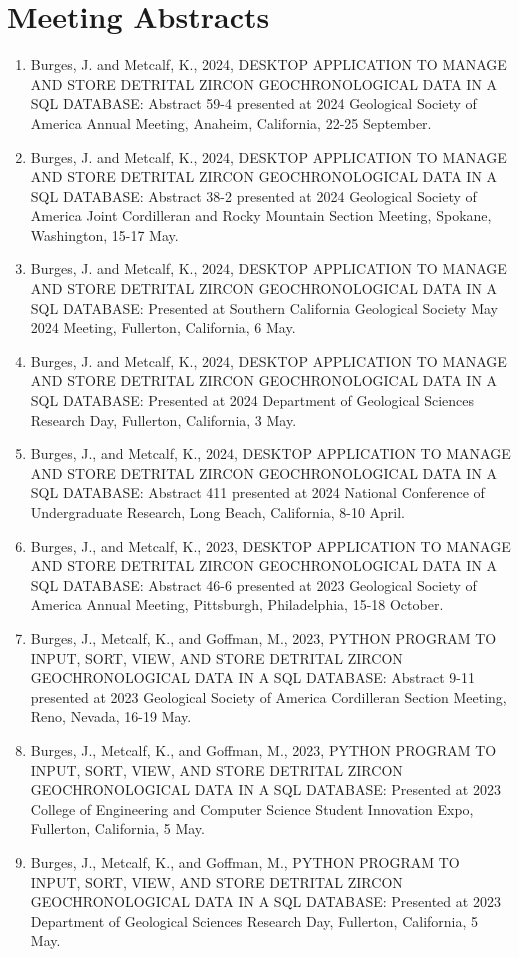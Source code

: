 \documentclass[11pt,a4paper,sans]{moderncv}
\begin{document}
\section{Meeting Abstracts}
\begin{enumerate}[9.]
\item Burges, J. and Metcalf, K., 2024, DESKTOP APPLICATION TO MANAGE AND STORE DETRITAL ZIRCON GEOCHRONOLOGICAL DATA IN A SQL DATABASE: Abstract 59-4 presented at 2024 Geological Society of America Annual Meeting, Anaheim, California, 22-25 September.
\item Burges, J. and Metcalf, K., 2024, DESKTOP APPLICATION TO MANAGE AND STORE DETRITAL ZIRCON GEOCHRONOLOGICAL DATA IN A SQL DATABASE: Abstract 38-2 presented at 2024 Geological Society of America Joint Cordilleran and Rocky Mountain Section Meeting, Spokane, Washington, 15-17 May.
\item Burges, J. and Metcalf, K., 2024, DESKTOP APPLICATION TO MANAGE AND STORE DETRITAL ZIRCON GEOCHRONOLOGICAL DATA IN A SQL DATABASE: Presented at Southern California Geological Society May 2024 Meeting, Fullerton, California, 6 May.
\item Burges, J. and Metcalf, K., 2024, DESKTOP APPLICATION TO MANAGE AND STORE DETRITAL ZIRCON GEOCHRONOLOGICAL DATA IN A SQL DATABASE: Presented at 2024 Department of Geological Sciences Research Day, Fullerton, California, 3 May.
\item Burges, J., and Metcalf, K., 2024, DESKTOP APPLICATION TO MANAGE AND STORE DETRITAL ZIRCON GEOCHRONOLOGICAL DATA IN A SQL DATABASE: Abstract 411 presented at 2024 National Conference of Undergraduate Research, Long Beach, California, 8-10 April.
\item Burges, J., and Metcalf, K., 2023, DESKTOP APPLICATION TO MANAGE AND STORE DETRITAL ZIRCON GEOCHRONOLOGICAL DATA IN A SQL DATABASE: Abstract 46-6 presented at 2023 Geological Society of America Annual Meeting, Pittsburgh, Philadelphia, 15-18 October.
\item Burges, J., Metcalf, K., and Goffman, M., 2023, PYTHON PROGRAM TO INPUT, SORT, VIEW, AND STORE DETRITAL ZIRCON GEOCHRONOLOGICAL DATA IN A SQL DATABASE: Abstract 9-11 presented at 2023 Geological Society of America Cordilleran Section Meeting, Reno, Nevada, 16-19 May.
\item Burges, J., Metcalf, K., and Goffman, M., 2023, PYTHON PROGRAM TO INPUT, SORT, VIEW, AND STORE DETRITAL ZIRCON GEOCHRONOLOGICAL DATA IN A SQL DATABASE: Presented at 2023 College of Engineering and Computer Science Student Innovation Expo, Fullerton, California, 5 May.
\item Burges, J., Metcalf, K., and Goffman, M., PYTHON PROGRAM TO INPUT, SORT, VIEW, AND STORE DETRITAL ZIRCON GEOCHRONOLOGICAL DATA IN A SQL DATABASE: Presented at 2023 Department of Geological Sciences Research Day, Fullerton, California, 5 May.
\end{enumerate}
\end{document}

